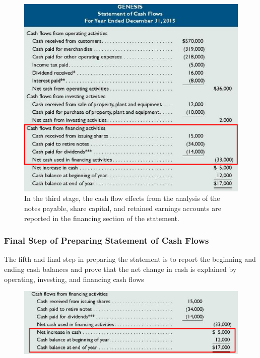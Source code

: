 \documentclass[../main.tex]{subfiles}
\begin{document}
\begin{figure}[ht!]
		\includegraphics[width=1\columnwidth]{images/c11/third_stage_finance.png}
		\caption{In the third stage, the cash flow effects from the analysis of 
		the notes payable, share capital, and retained earnings accounts are 
		reported in the financing section of the statement.}	
	\end{figure}

	\subsubsection{Final Step of Preparing Statement of Cash Flows}
	
	The fifth and final step in preparing the statement is to report the 
	beginning and ending cash balances and prove that the net change in cash is 
	explained by operating, investing, and financing cash flows

	\begin{figure}[ht!]
		\centering
		\includegraphics[width=1\columnwidth]{images/c11/final_step.png}	
	\end{figure}
\end{document}
